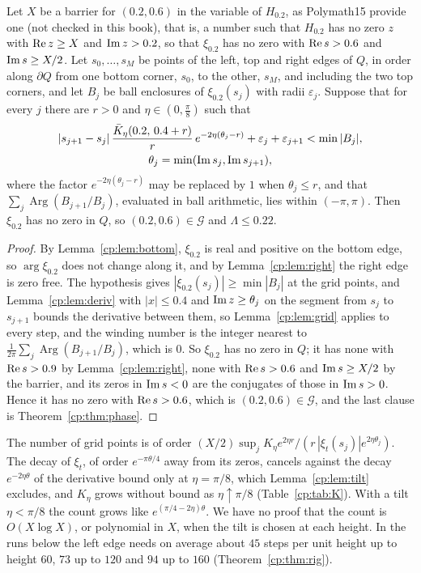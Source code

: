 \begin{theorem}\label{cp:thm:cert}
Let $X$ be a barrier for $(0.2,0.6)$ in the variable of $H_{0.2}$, as Polymath15 provide one \cite{Polymath} (not checked in this book), that is, a number such that $H_{0.2}$ has no zero $z$ with $\operatorname{Re} z\ge X$ and $\operatorname{Im} z>0.2$, so that $\xi_{0.2}$ has no zero with $\operatorname{Re} s>0.6$ and $\operatorname{Im} s\ge X/2$. Let $s_0,\dots,s_M$ be points of the left, top and right edges of $Q$, in order along $\partial Q$ from one bottom corner, $s_0$, to the other, $s_M$, and including the two top corners, and let $B_j$ be ball enclosures of $\xi_{0.2}(s_j)$ with radii $\varepsilon_j$. Suppose that for every $j$ there are $r>0$ and $\eta\in(0,\frac\pi8)$ such that
\[\begin{gathered}
|s_{j+1}-s_j|\,\frac{\bar K_\eta(0.2,\,0.4+r)}{r}\,e^{-2\eta(\theta_j-r)}+\varepsilon_j+\varepsilon_{j+1}<\min|B_j|,\\ \theta_j=\min(\operatorname{Im} s_j,\operatorname{Im} s_{j+1}),
\end{gathered}\]
where the factor $e^{-2\eta(\theta_j-r)}$ may be replaced by $1$ when $\theta_j\le r$, and that $\sum_j\operatorname{Arg}(B_{j+1}/B_j)$, evaluated in ball arithmetic, lies within $(-\pi,\pi)$. Then $\xi_{0.2}$ has no zero in $Q$, so $(0.2,0.6)\in\mathcal G$ and $\Lambda\le0.22$.
\end{theorem}

\begin{proof}
By Lemma~\ref{cp:lem:bottom}, $\xi_{0.2}$ is real and positive on the bottom edge, so $\arg\xi_{0.2}$ does not change along it, and by Lemma~\ref{cp:lem:right} the right edge is zero free. The hypothesis gives $|\xi_{0.2}(s_j)|\ge\min|B_j|$ at the grid points, and Lemma~\ref{cp:lem:deriv} with $|x|\le0.4$ and $\operatorname{Im} z\ge\theta_j$ on the segment from $s_j$ to $s_{j+1}$ bounds the derivative between them, so Lemma~\ref{cp:lem:grid} applies to every step, and the winding number is the integer nearest to $\frac1{2\pi}\sum_j\operatorname{Arg}(B_{j+1}/B_j)$, which is $0$. So $\xi_{0.2}$ has no zero in $Q$; it has none with $\operatorname{Re} s>0.9$ by Lemma~\ref{cp:lem:right}, none with $\operatorname{Re} s>0.6$ and $\operatorname{Im} s\ge X/2$ by the barrier, and its zeros in $\operatorname{Im} s<0$ are the conjugates of those in $\operatorname{Im} s>0$. Hence it has no zero with $\operatorname{Re} s>0.6$, which is $(0.2,0.6)\in\mathcal G$, and the last clause is Theorem~\ref{cp:thm:phase}.
\end{proof}

The number of grid points is of order $(X/2)\sup_jK_\eta e^{2\eta r}/(r\,|\xi_t(s_j)|e^{2\eta\theta_j})$. The decay of $\xi_t$, of order $e^{-\pi\theta/4}$ away from its zeros, cancels against the decay $e^{-2\eta\theta}$ of the derivative bound only at $\eta=\pi/8$, which Lemma~\ref{cp:lem:tilt} excludes, and $K_\eta$ grows without bound as $\eta\uparrow\pi/8$ (Table~\ref{cp:tab:K}). With a tilt $\eta<\pi/8$ the count grows like $e^{(\pi/4-2\eta)\theta}$. We have no proof that the count is $O(X\log X)$, or polynomial in $X$, when the tilt is chosen at each height. In the runs below the left edge needs on average about $45$ steps per unit height up to height $60$, $73$ up to $120$ and $94$ up to $160$ (Theorem~\ref{cp:thm:rig}).

